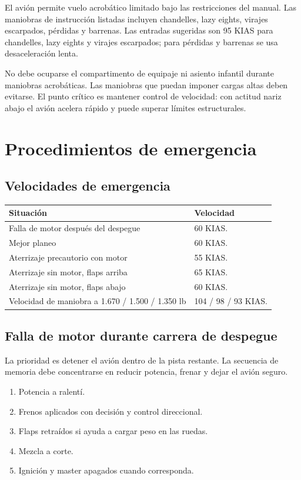 \documentclass[11pt,oneside]{book}
\newenvironment{checklist}{\begin{enumerate}[label=\arabic*.]}{\end{enumerate}}
\begin{document}
El avión permite vuelo acrobático limitado bajo las restricciones del manual. Las maniobras de instrucción listadas incluyen chandelles, lazy eights, virajes escarpados, pérdidas y barrenas. Las entradas sugeridas son 95 KIAS para chandelles, lazy eights y virajes escarpados; para pérdidas y barrenas se usa desaceleración lenta.

No debe ocuparse el compartimento de equipaje ni asiento infantil durante maniobras acrobáticas. Las maniobras que puedan imponer cargas altas deben evitarse. El punto crítico es mantener control de velocidad: con actitud nariz abajo el avión acelera rápido y puede superar límites estructurales.

\chapter{Procedimientos de emergencia}

\section{Velocidades de emergencia}

\begin{tabularx}{\textwidth}{@{}p{}Y@{}}
\toprule
\textbf{Situación} & \textbf{Velocidad} \\
\midrule
Falla de motor después del despegue & 60 KIAS. \\
Mejor planeo & 60 KIAS. \\
Aterrizaje precautorio con motor & 55 KIAS. \\
Aterrizaje sin motor, flaps arriba & 65 KIAS. \\
Aterrizaje sin motor, flaps abajo & 60 KIAS. \\
Velocidad de maniobra a 1.670 / 1.500 / 1.350 lb & 104 / 98 / 93 KIAS. \\
\bottomrule
\end{tabularx}

\section{Falla de motor durante carrera de despegue}

La prioridad es detener el avión dentro de la pista restante. La secuencia de memoria debe concentrarse en reducir potencia, frenar y dejar el avión seguro.

\begin{checklist}
\item Potencia a ralentí.
\item Frenos aplicados con decisión y control direccional.
\item Flaps retraídos si ayuda a cargar peso en las ruedas.
\item Mezcla a corte.
\item Ignición y master apagados cuando corresponda.
\end{checklist}
\end{document}
